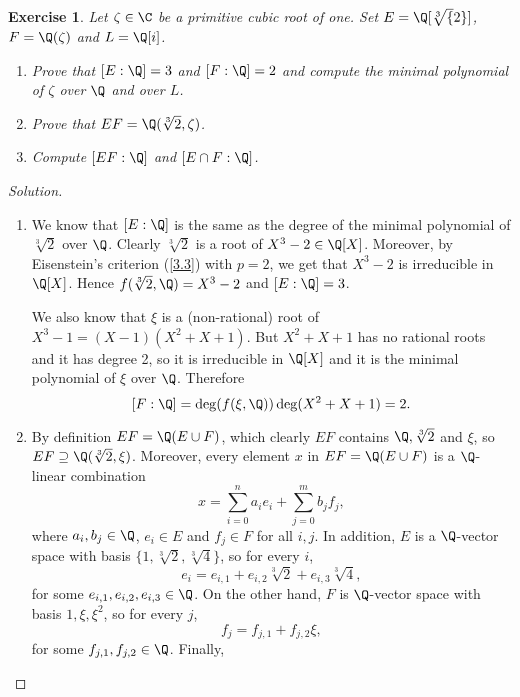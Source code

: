 \documentclass[a4paper,10pt,reqno]{amsart}
\newtheorem{ex}{Exercise}[section]
\newenvironment{sol}
  {\renewcommand\qedsymbol{$\blacksquare$}\begin{proof}[Solution]}
  {\end{proof}}
\begin{document}
\begin{ex}
\label{3.4}
Let $\zeta\in\C$ be a primitive cubic root of one.
Set $E=\Q[\sqrt[3]{2}]$, $F=\Q(\zeta)$ and $L=\Q[i]$.
\begin{enumerate}[label=(\roman*)]
    \item Prove that $[E:\Q]=3$ and $[F:\Q]=2$ and compute the minimal polynomial of $\zeta$ over $\Q$ and over $L$.
    \item Prove that $EF=\Q(\sqrt[3]{2},\zeta)$.
    \item Compute $[EF:\Q]$ and $[E\cap F:\Q]$.
\end{enumerate}  
\end{ex}
\begin{sol}~
 \begin{enumerate}[label=(\roman*)]
    \item We know that $[E:\Q]$ is the same as
    the degree of the minimal polynomial of $\sqrt[3]{2}$
    over $\Q$.
    Clearly $\sqrt[3]{2}$ is a root of $X^3-2\in\Q[X]$.
    Moreover, by Eisenstein's criterion (\cref{3.3}) with
    $p=2$, we get that $X^3-2$ is irreducible in $\Q[X]$.
    Hence $f(\sqrt[3]{2},\Q)=X^3-2$ and $[E:\Q]=3$.

    We also know that $\xi$ is a 
    (non-rational) root of $X^3-1=(X-1)(X^2+X+1)$.
    But $X^2+X+1$ has no rational roots and it has degree
    2, so it is irreducible in $\Q[X]$ and it is
    the minimal polynomial of $\xi$ over $\Q$.
    Therefore 
    $$[F:\Q]=\deg(f(\xi,\Q))\deg(X^2+X+1)=2.$$
    \item By definition $EF=\Q(E\cup F)$, which clearly 
    $EF$ contains $\Q, \sqrt[3]{2}$ and $ \xi$, so 
    $EF\supseteq \Q(\sqrt[3]{2},\xi)$.
    Moreover, every element $x$ in $EF=\Q(E\cup F)$ 
    is a $\Q$-linear combination
    \[
    x=\sum_{i=0}^n a_i e_i +\sum_{j=0}^m b_j f_j,
    \]
    where $a_i,b_j\in\Q$, $e_i\in E$ and $f_j\in F$
    for all $i,j$.
    In addition, $E$ is a $\Q$-vector space with basis
    $\{1,\sqrt[3]{2},\sqrt[3]{4}\}$, so for every $i$,
    \[
    e_i=e_{i,1}+e_{i,2}\sqrt[3]{2}+e_{i,3}\sqrt[3]{4},
    \]
    for some $e_{i,1}, e_{i,2}, e_{i,3}\in\Q$.    
    On the other hand, $F$ is $\Q$-vector space with 
    basis $1, \xi, \xi^2$, so for every $j$,
    \[
    f_j=f_{j,1}+f_{j,2}\xi,
    \]
    for some $f_{j,1}, f_{j,2}\in\Q$.
    Finally, 
    

\end{enumerate}
\end{sol}
\end{document}
